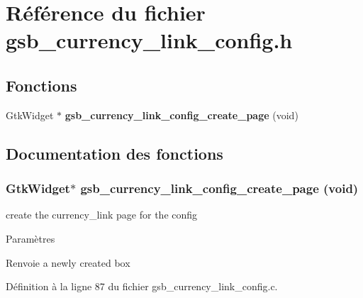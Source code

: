 \section{Référence du fichier gsb\_\-currency\_\-link\_\-config.h}
\label{gsb__currency__link__config_8h}
\subsection*{Fonctions}
\begin{DoxyCompactItemize}
\item 
GtkWidget $\ast$ {\bf gsb\_\-currency\_\-link\_\-config\_\-create\_\-page} (void)
\end{DoxyCompactItemize}


\subsection{Documentation des fonctions}
\subsubsection[{gsb\_\-currency\_\-link\_\-config\_\-create\_\-page}]{\setlength{\rightskip}{0pt plus 5cm}GtkWidget$\ast$ gsb\_\-currency\_\-link\_\-config\_\-create\_\-page (void)}\label{gsb__currency__link__config_8h_ae256efc27c512e121dafe219352b4767}
create the currency\_\-link page for the config


\begin{DoxyParams}{Paramètres}
\item[{\em }]\end{DoxyParams}
\begin{DoxyReturn}{Renvoie}
a newly created box 
\end{DoxyReturn}


Définition à la ligne 87 du fichier gsb\_\-currency\_\-link\_\-config.c.

